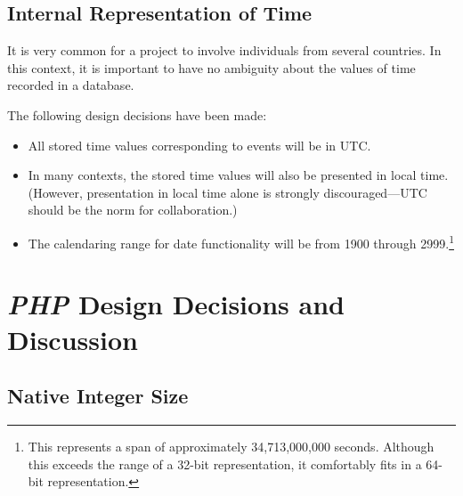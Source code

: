 \subsection{Internal Representation of Time}
\label{ctbg0:sddc0:srti0}

It is very common for a project to involve individuals from several
countries.  In this context, it is important to have no ambiguity
about the values of time recorded in a database.

The following design decisions have been made:

\begin{itemize}
\item All stored time values corresponding to events will
      be in UTC.
\item In many contexts, the stored time values will also
      be presented in local time.  (However, 
      presentation in local time alone is strongly discouraged---UTC should be the norm
      for collaboration.)
\item The calendaring range for date functionality will be
      from 1900 through 2999.\footnote{This represents a
      span of approximately 34,713,000,000 seconds.  Although this
      exceeds the range of a 32-bit representation, it comfortably
      fits in a 64-bit representation.}
\end{itemize}

\section{\emph{PHP} Design Decisions and Discussion}
\label{ctbg0:sphp0}


\subsection{Native Integer Size}
\label{ctbg0:sphp0:snis0}

